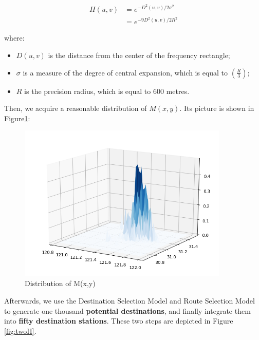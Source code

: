 \documentclass{mcmthesis}
\begin{document}
\begin{equation}
    \begin{split}
      H(u,v)     & =   e^{-D^2(u,v)/2\sigma^2}\\
                 & =   e^{-9D^2(u,v)/2R^2}
    \end{split}
\end{equation}

where:
\begin{itemize}
\item $D(u,v)$ is the distance from the center of the frequency rectangle;
\item $\sigma$ is a measure of the degree of central expansion, which is equal to $\left( \frac{R}{3} \right)$;
\item $R$ is the precision radius, which is equal to 600 metres.
\end{itemize}

Then, we acquire a reasonable distribution of $M(x,y)$. Its picture is shown in Figure\ref{fig:M(x,y)}:

\begin{figure}[htbp]
    \centering
    \includegraphics[width=10cm]{figures/M(x,y).png}
    \caption{Distribution of M(x,y)}
    \label{fig:M(x,y)}
\end{figure}

Afterwards, we use the Destination Selection Model and Route Selection Model to generate one thousand \textbf{potential destinations}, and finally integrate them into \textbf{fifty destination stations}. These two steps are depicted in Figure \ref{fig:twoII}.
\end{document}

